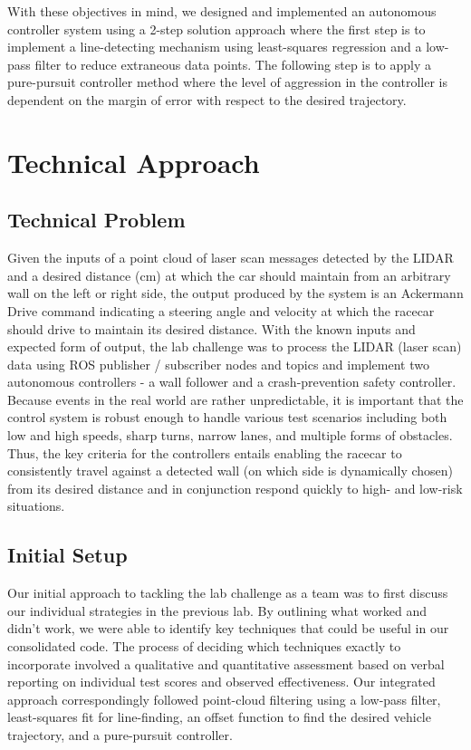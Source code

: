 \documentclass{article}
\begin{document}
With these objectives in mind, we designed and implemented an autonomous controller system using a 2-step solution approach where the first step is to implement a line-detecting mechanism using least-squares regression and a low-pass filter to reduce extraneous data points. The following step is to apply a pure-pursuit controller method where the level of aggression in the controller is dependent on the margin of error with respect to the desired trajectory. \\

\section{Technical Approach}
\author{Tiasa Kim}
\subsection{Technical Problem}
Given the inputs of a point cloud of laser scan messages detected by the LIDAR and a desired distance (cm) at which the car should maintain from an arbitrary wall on the left or right side, the output produced by the system is an Ackermann Drive command indicating a steering angle and velocity at which the racecar should drive to maintain its desired distance. With the known inputs and expected form of output, the lab challenge was to process the LIDAR (laser scan) data using ROS publisher / subscriber nodes and topics and implement two autonomous controllers - a wall follower and a crash-prevention safety controller. \\

Because events in the real world are rather unpredictable, it is important that the control system is robust enough to handle various test scenarios including both low and high speeds, sharp turns, narrow lanes, and multiple forms of obstacles. Thus, the key criteria for the controllers entails enabling the racecar to consistently travel against a detected wall (on which side is dynamically chosen) from its desired distance and in conjunction respond quickly to high- and low-risk situations. 

\subsection{Initial Setup}
Our initial approach to tackling the lab challenge as a team was to first discuss our individual strategies in the previous lab. By outlining what worked and didn’t work, we were able to identify key techniques that could be useful in our consolidated code. The process of deciding which techniques exactly to incorporate involved a qualitative and quantitative assessment based on verbal reporting on individual test scores and observed effectiveness. Our integrated approach correspondingly followed point-cloud filtering using a low-pass filter, least-squares fit for line-finding, an offset function to find the desired vehicle trajectory, and a pure-pursuit controller. \\
\end{document}
